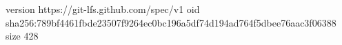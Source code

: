 version https://git-lfs.github.com/spec/v1
oid sha256:789bf4461fbde23507f9264ec0bc196a5df74d194ad764f5dbee76aac3f06388
size 428
